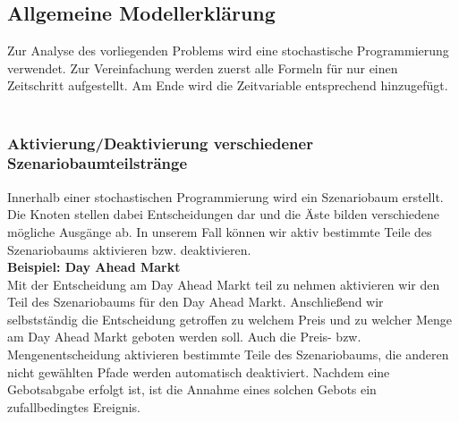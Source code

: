\documentclass{article}
\begin{document}
\subsection{Allgemeine Modellerklärung}
Zur Analyse des vorliegenden Problems wird eine stochastische Programmierung verwendet. 
Zur Vereinfachung werden zuerst alle Formeln für nur einen Zeitschritt aufgestellt. Am Ende wird die Zeitvariable entsprechend hinzugefügt.
\\
\\


\subsubsection{Aktivierung/Deaktivierung verschiedener Szenariobaumteilstränge}
 Innerhalb einer stochastischen Programmierung wird ein Szenariobaum erstellt. Die Knoten stellen dabei Entscheidungen dar und die Äste bilden verschiedene mögliche Ausgänge ab. In unserem Fall können wir aktiv bestimmte Teile des Szenariobaums aktivieren bzw. deaktivieren.\\

\textbf{Beispiel: Day Ahead Markt}\\
Mit der Entscheidung am Day Ahead Markt teil zu nehmen aktivieren wir den Teil des Szenariobaums für den Day Ahead Markt. Anschließend wir selbstständig die Entscheidung getroffen zu welchem Preis und zu welcher Menge am Day Ahead Markt geboten werden soll. Auch die Preis- bzw. Mengenentscheidung aktivieren bestimmte Teile des Szenariobaums, die anderen nicht gewählten Pfade werden automatisch deaktiviert. Nachdem eine Gebotsabgabe erfolgt ist, ist die Annahme eines solchen Gebots ein zufallbedingtes Ereignis.
\end{document}
